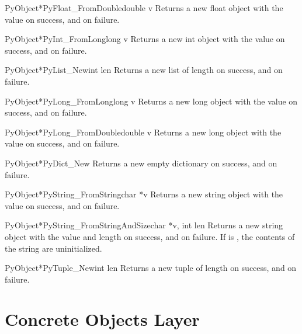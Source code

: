 \documentclass{manual}
\begin{document}
\begin{cfuncdesc}{PyObject*}{PyFloat_FromDouble}{double v}
Returns a new float object with the value  on success, and
\NULL{} on failure.
\end{cfuncdesc}

\begin{cfuncdesc}{PyObject*}{PyInt_FromLong}{long v}
Returns a new int object with the value  on success, and
\NULL{} on failure.
\end{cfuncdesc}

\begin{cfuncdesc}{PyObject*}{PyList_New}{int len}
Returns a new list of length  on success, and \NULL{} on
failure.
\end{cfuncdesc}

\begin{cfuncdesc}{PyObject*}{PyLong_FromLong}{long v}
Returns a new long object with the value  on success, and
\NULL{} on failure.
\end{cfuncdesc}

\begin{cfuncdesc}{PyObject*}{PyLong_FromDouble}{double v}
Returns a new long object with the value  on success, and
\NULL{} on failure.
\end{cfuncdesc}

\begin{cfuncdesc}{PyObject*}{PyDict_New}{}
Returns a new empty dictionary on success, and \NULL{} on
failure.
\end{cfuncdesc}

\begin{cfuncdesc}{PyObject*}{PyString_FromString}{char *v}
Returns a new string object with the value  on success, and
\NULL{} on failure.
\end{cfuncdesc}

\begin{cfuncdesc}{PyObject*}{PyString_FromStringAndSize}{char *v, int len}
Returns a new string object with the value  and length
 on success, and \NULL{} on failure.  If  is \NULL{},
the contents of the string are uninitialized.
\end{cfuncdesc}

\begin{cfuncdesc}{PyObject*}{PyTuple_New}{int len}
Returns a new tuple of length  on success, and \NULL{} on
failure.
\end{cfuncdesc}


\chapter{Concrete Objects Layer \label{concrete}}
\end{document}
